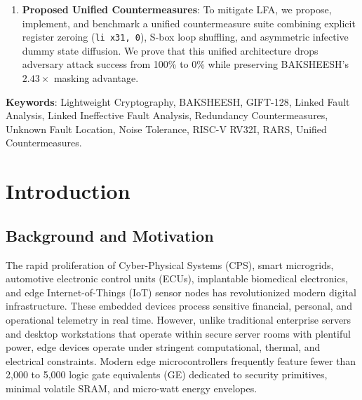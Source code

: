 \documentclass[12pt,a4paper,oneside]{report}
\begin{document}
\begin{enumerate}
    \item \textbf{Proposed Unified Countermeasures}: To mitigate LFA, we propose, implement, and benchmark a unified countermeasure suite combining explicit register zeroing (\texttt{li x31, 0}), S-box loop shuffling, and asymmetric infective dummy state diffusion. We prove that this unified architecture drops adversary attack success from 100\% to 0\% while preserving BAKSHEESH's $2.43\times$ masking advantage.
\end{enumerate}

\noindent
\textbf{Keywords}: Lightweight Cryptography, BAKSHEESH, GIFT-128, Linked Fault Analysis, Linked Ineffective Fault Analysis, Redundancy Countermeasures, Unknown Fault Location, Noise Tolerance, RISC-V RV32I, RARS, Unified Countermeasures.

\cleardoublepage


\tableofcontents
\cleardoublepage

\listoffigures
{}
\cleardoublepage

\listoftables
{}
\cleardoublepage

\setcounter{page}{1}

\chapter{Introduction}
\label{ch:intro}

\section{Background and Motivation}
\label{sec:background}
The rapid proliferation of Cyber-Physical Systems (CPS), smart microgrids, automotive electronic control units (ECUs), implantable biomedical electronics, and edge Internet-of-Things (IoT) sensor nodes has revolutionized modern digital infrastructure. These embedded devices process sensitive financial, personal, and operational telemetry in real time. However, unlike traditional enterprise servers and desktop workstations that operate within secure server rooms with plentiful power, edge devices operate under stringent computational, thermal, and electrical constraints. Modern edge microcontrollers frequently feature fewer than 2,000 to 5,000 logic gate equivalents (GE) dedicated to security primitives, minimal volatile SRAM, and micro-watt energy envelopes.
\end{document}
